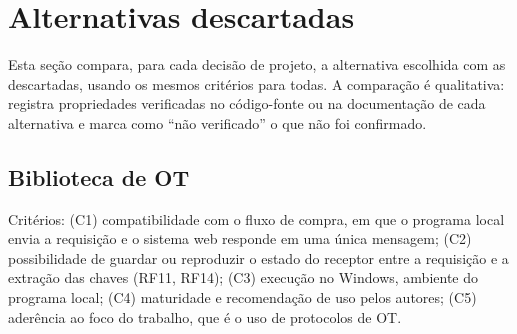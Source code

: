 \documentclass[12pt, oneside, a4paper, english, brazil]{abntex2}
\begin{document}
\section{Alternativas descartadas}\label{sec:alternativas}

Esta seção compara, para cada decisão de projeto, a alternativa escolhida com
as descartadas, usando os mesmos critérios para todas. A comparação é
qualitativa: registra propriedades verificadas no código-fonte ou na
documentação de cada alternativa e marca como ``não verificado'' o que não foi
confirmado.

\subsection{Biblioteca de OT}

Critérios:
(C1) compatibilidade com o fluxo de compra, em que o programa local envia a
requisição e o sistema web responde em uma única mensagem;
(C2) possibilidade de guardar ou reproduzir o estado do receptor entre a
requisição e a extração das chaves (RF11, RF14);
(C3) execução no Windows, ambiente do programa local;
(C4) maturidade e recomendação de uso pelos autores;
(C5) aderência ao foco do trabalho, que é o uso de protocolos de OT.
\end{document}
